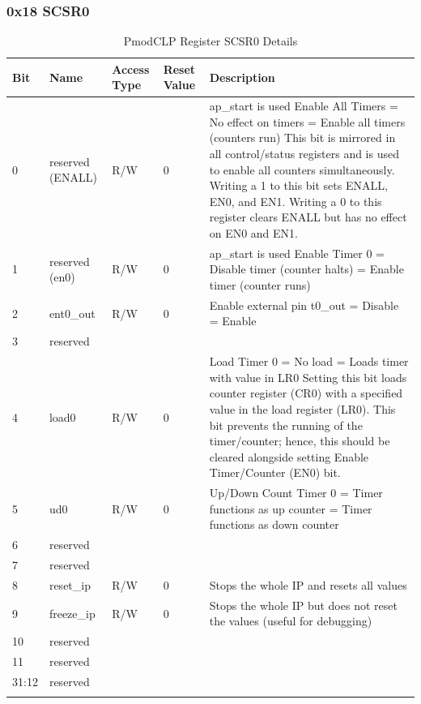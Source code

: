 \subsubsection*{0x18 SCSR0}
\begin{longtable}{|p{1.5cm}|p{3cm}|p{2cm}|p{2cm}|p{5cm}|}
\hline
\textbf{Bit} & \textbf{Name} & \textbf{Access Type} & \textbf{Reset Value} & \textbf{Description} \\
\hline
0 & reserved (ENALL) & R/W & 0 & ap\_start is used Enable All Timers
\newline 0 = No effect on timers
\newline 1 = Enable all timers (counters run)
\newline This bit is mirrored in all control/status registers and is used to enable all counters simultaneously.
\newline Writing a 1 to this bit sets ENALL, EN0, and EN1.
\newline Writing a 0 to this register clears ENALL but has no effect on EN0 and EN1. \\
\hline
1 & reserved (en0) & R/W & 0 & ap\_start is used Enable Timer 0
\newline 0 = Disable timer (counter halts)
\newline 1 = Enable timer (counter runs) \\
\hline
2 & ent0\_out & R/W & 0 & Enable external pin t0\_out
\newline 0 = Disable
\newline 1 = Enable \\
\hline
3 & reserved & & & \\
\hline
4 & load0 & R/W & 0 & Load Timer 0
\newline 0 = No load
\newline 1 = Loads timer with value in LR0
\newline Setting this bit loads counter register (CR0) with a specified value in the load register (LR0).
\newline This bit prevents the running of the timer/counter; hence, this should be cleared alongside setting Enable Timer/Counter (EN0) bit. \\
\hline
5 & ud0 & R/W & 0 & Up/Down Count Timer 0
\newline 0 = Timer functions as up counter
\newline 1 = Timer functions as down counter \\
\hline
6 & reserved & & & \\
\hline
7 & reserved & & & \\
\hline
8 & reset\_ip & R/W & 0 & Stops the whole IP and resets all values \\
\hline
9 & freeze\_ip & R/W & 0 & Stops the whole IP but does not reset the values (useful for debugging) \\
\hline
10 & reserved & & & \\
\hline
11 & reserved & & & \\
\hline
31:12 & reserved & & & \\
\hline
\caption{PmodCLP Register SCSR0 Details}
\end{longtable}

